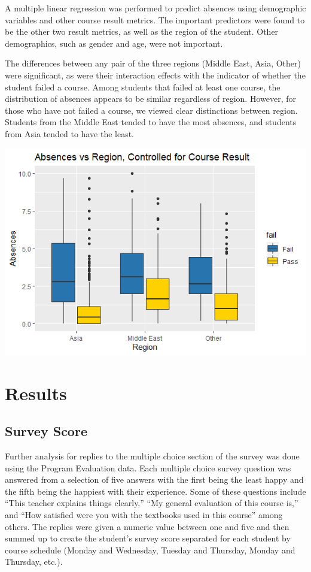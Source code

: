 \documentclass[12pt,letterpaper]{article}
\begin{document}
A multiple linear regression was performed to predict absences using demographic variables and other course result metrics. The important predictors were found to be the other two result metrics, as well as the region of the student. Other demographics, such as gender and age, were not important.

The differences between any pair of the three regions (Middle East, Asia, Other) were significant, as were their interaction effects with the indicator of whether the student failed a course. Among students that failed at least one course, the distribution of absences appears to be similar regardless of region. However, for those who have not failed a course, we viewed clear distinctions between region. Students from the Middle East tended to have the most absences, and students from Asia tended to have the least.

\begin{center}
    \includegraphics[width = \textwidth]{Plots/region_absences.png}
\end{center}

\newpage

\section{Results}

\subsection{Survey Score}

	Further analysis for replies to the multiple choice section of the survey was done using the Program Evaluation data. Each multiple choice survey question was answered from a selection of five answers with the first being the least happy and the fifth being the happiest with their experience. Some of these questions include “This teacher explains things clearly,” “My general evaluation of this course is,” and “How satisfied were you with the textbooks used in this course” among others. The replies were given a numeric value between one and five and then summed up to create the student’s survey score separated for each student by course schedule (Monday and Wednesday, Tuesday and Thursday, Monday and Thursday, etc.).
	
\end{document}
